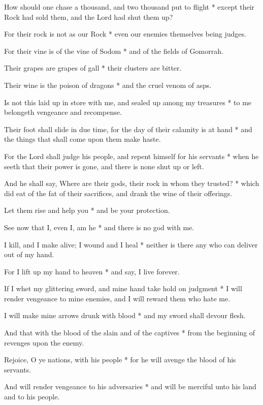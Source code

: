 How should one chase a thousand, and two thousand put to flight * except their Rock had sold them, and the Lord had shut them up?

For their rock is not as our Rock * even our enemies themselves being judges.

For their vine is of the vine of Sodom * and of the fields of Gomorrah.

Their grapes are grapes of gall * their clusters are bitter.

Their wine is the poison of dragons * and the cruel venom of asps.

Is not this laid up in store with me, and sealed up among my treasures *  to me belongeth vengeance and recompense.

Their foot shall slide in due time, for the day of their calamity is at hand * and the things that shall come upon them make haste.

For the Lord shall judge his people, and repent himself for his servants * when he seeth that their power is gone, and there is none shut up or left.

And he shall say, Where are their gods, their rock in whom they trusted? * which did eat of the fat of their sacrifices, and drank the wine of their offerings.

Let them rise and help you * and be your protection.

See now that I, even I, am he * and there is no god with me.

I kill, and I make alive; I wound and I heal * neither is there any who can deliver out of my hand.

For I lift up my hand to heaven * and say, I live forever.

If I whet my glittering sword, and mine hand take hold on judgment * I will render vengeance to mine enemies, and I will reward them who hate me.

I will make mine arrows drunk with blood * and my sword shall devour flesh.

And that with the blood of the slain and of the captives * from the beginning of revenges upon the enemy.

Rejoice, O ye nations, with his people * for he will avenge the blood of his servants.

And will render vengeance to his adversaries * and will be merciful unto his land and to his people.